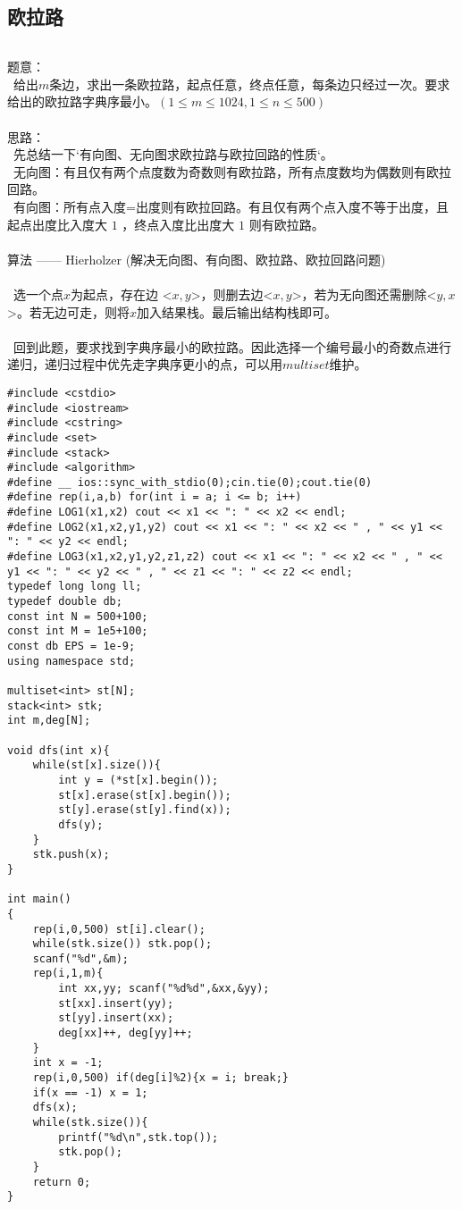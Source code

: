 \documentclass[twoside]{article}
\begin{document}
\subsection{欧拉路}
\begin{lstlisting}
\end{lstlisting}
题意：\\
\ 给出$m$条边，求出一条欧拉路，起点任意，终点任意，每条边只经过一次。要求给出的欧拉路字典序最小。$(1\leq m\leq 1024,1\leq n\leq 500)$ \\
\\
思路：\\
\ 先总结一下`有向图、无向图求欧拉路与欧拉回路的性质`。 \\
\ 无向图：有且仅有两个点度数为奇数则有欧拉路，所有点度数均为偶数则有欧拉回路。\\
\ 有向图：所有点入度=出度则有欧拉回路。有且仅有两个点入度不等于出度，且起点出度比入度大 $1$ ，终点入度比出度大 $1$ 则有欧拉路。\\
\\
算法 —— Hierholzer (解决无向图、有向图、欧拉路、欧拉回路问题)\\
\\
\ 选一个点$x$为起点，存在边 <$x,y$>，则删去边<$x,y$>，若为无向图还需删除<$y,x$>。若无边可走，则将$x$加入结果栈。最后输出结构栈即可。\\
\\
\ 回到此题，要求找到字典序最小的欧拉路。因此选择一个编号最小的奇数点进行递归，递归过程中优先走字典序更小的点，可以用$multiset$维护。\\
\begin{lstlisting}
#include <cstdio>
#include <iostream>
#include <cstring>
#include <set>
#include <stack>
#include <algorithm>
#define __ ios::sync_with_stdio(0);cin.tie(0);cout.tie(0)
#define rep(i,a,b) for(int i = a; i <= b; i++)
#define LOG1(x1,x2) cout << x1 << ": " << x2 << endl;
#define LOG2(x1,x2,y1,y2) cout << x1 << ": " << x2 << " , " << y1 << ": " << y2 << endl;
#define LOG3(x1,x2,y1,y2,z1,z2) cout << x1 << ": " << x2 << " , " << y1 << ": " << y2 << " , " << z1 << ": " << z2 << endl;
typedef long long ll;
typedef double db;
const int N = 500+100;
const int M = 1e5+100;
const db EPS = 1e-9;
using namespace std;

multiset<int> st[N];
stack<int> stk;
int m,deg[N];

void dfs(int x){
	while(st[x].size()){
		int y = (*st[x].begin());
		st[x].erase(st[x].begin());
		st[y].erase(st[y].find(x));
		dfs(y);
	}
	stk.push(x);
}

int main()
{	
	rep(i,0,500) st[i].clear();
	while(stk.size()) stk.pop();
	scanf("%d",&m);
	rep(i,1,m){
		int xx,yy; scanf("%d%d",&xx,&yy);
		st[xx].insert(yy);
		st[yy].insert(xx);
		deg[xx]++, deg[yy]++;
	}
	int x = -1;
	rep(i,0,500) if(deg[i]%2){x = i; break;}
	if(x == -1) x = 1;
	dfs(x);
	while(stk.size()){
		printf("%d\n",stk.top());
		stk.pop();
	}
	return 0;
}\end{lstlisting}
\end{document}
